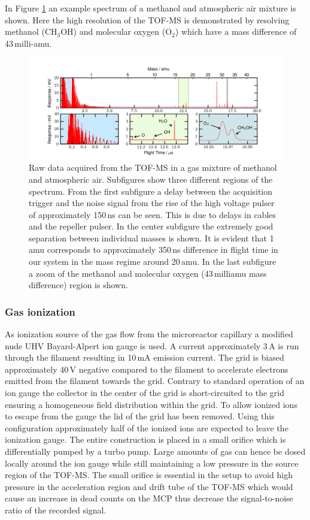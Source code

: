 \documentclass[aip,rsi]{revtex4-1}
\begin{document}
In Figure \ref{fig:untreated_data} an example spectrum of a methanol and atmospheric air mixture is shown. Here the high resolution of the TOF-MS is demonstrated by resolving methanol (CH$_3$OH) and molecular oxygen (O$_2$) which have a mass difference of 43\,milli-amu.
\begin{figure}
 \includegraphics[width=16cm]{untreated_data.png}%
 \caption{Raw data acquired from the TOF-MS in a gas mixture of methanol and atmospheric air. Subfigures show three different regions of the spectrum. From the first subfigure a delay between the acquisition trigger and the noise signal from the rise of the high voltage pulser of approximately 150\,ns can be seen. This is due to delays in cables and the repeller pulser. In the center subfigure the extremely good separation between individual masses is shown. It is evident that 1\,amu corresponds to approximately 350\,ns difference in flight time in our system in the mass regime around 20\,amu. In the last subfigure a zoom of the methanol and molecular oxygen (43\,milliamu mass difference) region is shown.\label{fig:untreated_data}}%
\end{figure}

\subsubsection{Gas ionization}
As ionization source of the gas flow from the microreactor capillary a modified nude UHV Bayard-Alpert ion gauge is used. A current approximately 3\,A is run through the filament resulting in 10\,mA emission current. The grid is biased approximately 40\,V negative compared to the filament to accelerate electrons emitted from the filament towards the grid. Contrary to standard operation of an ion gauge the collector in the center of the grid is short-circuited to the grid ensuring a homogeneous field distribution within the grid. To allow ionized ions to escape from the gauge the lid of the grid has been removed. Using this configuration approximately half of the ionized ions are expected to leave the ionization gauge\cite{Nottingham1955}. The entire construction is placed in a small orifice which is differentially pumped by a turbo pump. Large amounts of gas can hence be dosed locally around the ion gauge while still maintaining a low pressure in the source region of the TOF-MS. The small orifice is essential in the setup to avoid high pressure in the acceleration region and drift tube of the TOF-MS which would cause an increase in dead counts on the MCP thus decrease the signal-to-noise ratio of the recorded signal.
\end{document}
